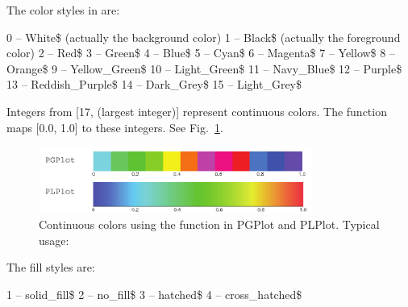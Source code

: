 The color styles in \quickplot are:
\begin{example}
    0 -- White\$   (actually the background color)
    1 -- Black\$   (actually the foreground color)
    2 -- Red\$
    3 -- Green\$
    4 -- Blue\$
    5 -- Cyan\$
    6 -- Magenta\$
    7 -- Yellow\$ 
    8 -- Orange\$
    9 -- Yellow_Green\$
   10 -- Light_Green\$
   11 -- Navy_Blue\$
   12 -- Purple\$
   13 -- Reddish_Purple\$
   14 -- Dark_Grey\$
   15 -- Light_Grey\$
\end{example}
   
Integers from [17, (largest integer)] represent continuous colors. The function  maps [0.0, 1.0] to these integers. See Fig.~\ref{f:plot-continuous-color}.

\begin{figure}
\centering
\includegraphics[width=0.8\textwidth]{plot-continuous-color.pdf}
\caption{Continuous colors using the function  in PGPlot and PLPlot. Typical usage: }
\label{f:plot-continuous-color}
\end{figure}

The fill styles are:
\begin{example}
    1 -- solid_fill\$        
    2 -- no_fill\$           
    3 -- hatched\$           
    4 -- cross_hatched\$     
\end{example}

